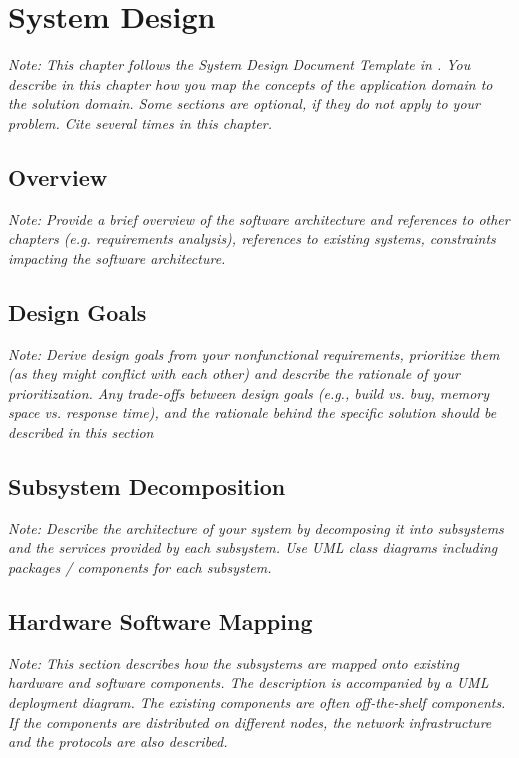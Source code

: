 \documentclass[a4paper,12pt,twoside]{report}
\begin{document}

\chapter{System Design}

\textit{Note: This chapter follows the System Design Document Template in \cite{bruegge2004object}. 
You describe in this chapter how you map the concepts of the application domain to the solution domain. Some sections are optional, if they do not apply to your problem.
Cite \cite{bruegge2004object} several times in this chapter.}

\section{Overview}

\textit{Note: Provide a brief overview of the software architecture and references to other chapters (e.g. requirements analysis), references to existing systems, constraints impacting the software architecture.}

\section{Design Goals}

\textit{Note: Derive design goals from your nonfunctional requirements, prioritize them (as they might conflict with each other) and describe the rationale of your prioritization. Any trade-offs between design goals (e.g., build vs. buy, memory space vs. response time),
and the rationale behind the specific solution should be described in this section}

\section{Subsystem Decomposition}

\textit{Note: Describe the architecture of your system by decomposing it into subsystems and the services provided by each subsystem. Use UML class diagrams including packages / components for each subsystem.}

\section{Hardware Software Mapping}

\textit{Note: This section describes how the subsystems are mapped onto existing hardware and software components. The description is accompanied by a UML deployment diagram. The existing components are often off-the-shelf components. If the components are distributed on different nodes, the network infrastructure and the protocols are also described.}
\end{document}
